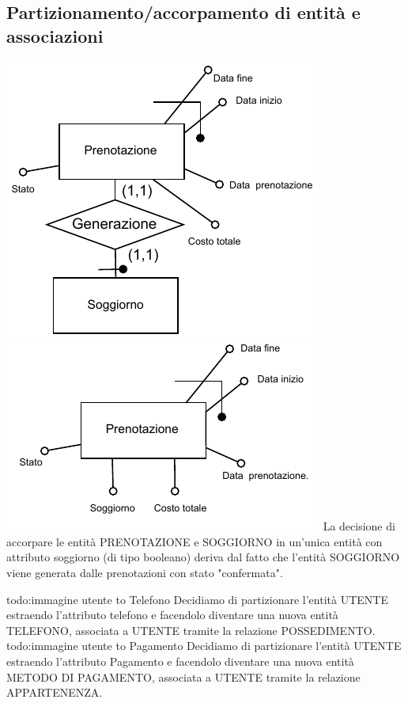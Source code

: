 \subsection{Partizionamento/accorpamento di entità e associazioni}
\includegraphics[width=\textwidth]{resources/page13}
\includegraphics[width=\textwidth]{resources/page14}
La decisione di accorpare le entità PRENOTAZIONE e SOGGIORNO in un'unica entità con attributo soggiorno (di tipo booleano) deriva dal fatto che l'entità SOGGIORNO viene generata dalle prenotazioni con stato "confermata".

{todo:immagine utente to Telefono}
Decidiamo di partizionare l'entità UTENTE estraendo l'attributo telefono e facendolo diventare una nuova entità TELEFONO, associata a UTENTE tramite la relazione POSSEDIMENTO.
{todo:immagine utente to Pagamento}
Decidiamo di partizionare l'entità UTENTE estraendo l'attributo Pagamento e facendolo diventare una nuova entità METODO DI PAGAMENTO, associata a UTENTE tramite la relazione APPARTENENZA.



